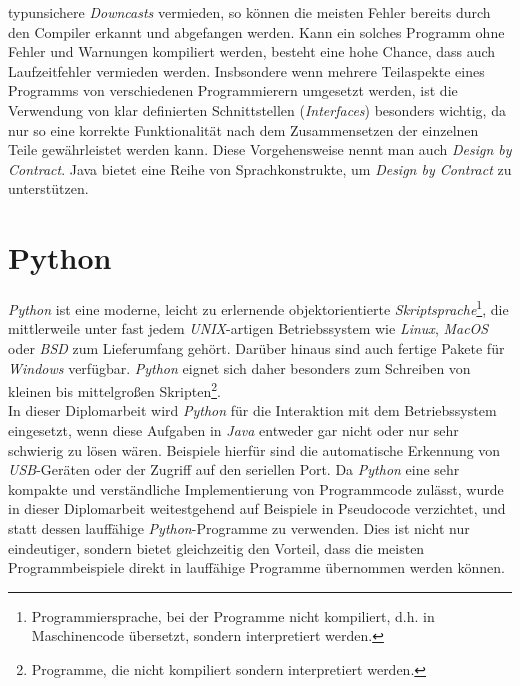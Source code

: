         typunsichere \emph{Downcasts} vermieden, so können die meisten Fehler bereits durch den Compiler erkannt und 
        abgefangen werden. Kann ein solches Programm ohne Fehler und Warnungen kompiliert werden, besteht eine hohe Chance,
        dass auch Laufzeitfehler vermieden werden. \cite{Java_Insel}
        Insbsondere wenn mehrere Teilaspekte eines Programms von verschiedenen Programmierern umgesetzt werden, 
        ist die Verwendung von klar definierten Schnittstellen (\emph{Interfaces}) besonders wichtig, da nur so eine korrekte
        Funktionalität nach dem Zusammensetzen der einzelnen Teile gewährleistet werden kann. Diese Vorgehensweise nennt
        man auch \emph{Design by Contract}. Java bietet eine Reihe von Sprachkonstrukte, um \emph{Design by Contract}
        zu unterstützen. \cite{Foo}

\section{Python}
    \emph{Python} ist eine moderne, leicht zu erlernende objektorientierte \emph{Skriptsprache}\footnote{Programmiersprache,
        bei der Programme nicht kompiliert, d.h. in Maschinencode übersetzt, sondern interpretiert werden.}, die mittlerweile 
    unter fast jedem \emph{UNIX}-artigen Betriebssystem wie \emph{Linux}, \emph{MacOS} oder \emph{BSD} zum Lieferumfang 
    gehört. Darüber hinaus sind auch fertige Pakete für \emph{Windows} verfügbar. \emph{Python} eignet sich daher 
    besonders zum Schreiben von kleinen
    bis mittelgroßen Skripten\footnote{Programme, die nicht kompiliert sondern interpretiert werden.}. \cite{Python}
    \\
    In dieser Diplomarbeit wird \emph{Python} für die Interaktion mit dem Betriebssystem
    eingesetzt, wenn diese Aufgaben in \emph{Java} entweder gar nicht oder nur sehr schwierig zu lösen wären. Beispiele
    hierfür sind die automatische Erkennung von \emph{USB}-Geräten oder der Zugriff auf den seriellen Port.
    Da \emph{Python} eine sehr kompakte und verständliche Implementierung von Programmcode zulässt, wurde in dieser
    Diplomarbeit weitestgehend auf Beispiele in Pseudocode verzichtet, und statt dessen lauffähige
    \emph{Python}-Programme zu verwenden. Dies ist nicht nur eindeutiger, sondern bietet gleichzeitig den Vorteil,
    dass die meisten Programmbeispiele direkt in lauffähige Programme übernommen werden können.

